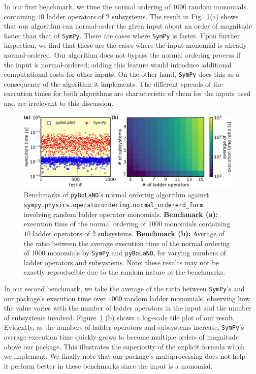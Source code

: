 \documentclass[onecolumn, 12pt, sort&compress]{elsarticle}
\newenvironment{revision}{}{}
\begin{document}
\begin{revision}
In our first benchmark, we time the normal ordering of $1000$ random monomials containing $10$ ladder operators of $2$ subsystems. The result in Fig.~\ref{fig_2}(a) shows that our algorithm can normal-order the given input about an order of magnitude faster than that of \texttt{SymPy}. There are cases where \texttt{SymPy} is faster.  Upon further inspection, we find that these are the cases where the input monomial is already normal-ordered. Our algorithm does not bypass the normal ordering process if the input is normal-ordered; adding this feature would introduce additional computational costs for other inputs. On the other hand, \texttt{SymPy} does this as a consequence of the algorithm it implements. The different spreads of the execution times for both algorithms are characteristic of them for the inputs used and are irrelevant to this discussion. 

\begin{figure}[!t]
    \centering
    \includegraphics[width=\linewidth]{fig_2.png}
    \caption{\begin{revision}Benchmarks of \texttt{pyBoLaNO}'s normal ordering algorithm against \texttt{sympy.physics.operatorordering.normal\_ordererd\_form} involving random ladder operator monomials. \textbf{Benchmark (a):} execution time of the normal ordering of $1000$ monomials containing $10$ ladder operators of $2$ subsystems. \textbf{Benchmark (b):} Average of the ratio between the average execution time of the normal ordering of $1000$ monomials by \texttt{SymPy} and \texttt{pyBoLaNO}, for varying numbers of ladder operators and subsystems. Note: these results may not be exactly reproducible due to the random nature of the benchmarks.\end{revision}}
    \label{fig_2}
\end{figure}

In our second benchmark, we take the average of the ratio between \texttt{SymPy}'s and our package's execution time over $1000$ random ladder monomials, observing how the value varies with the number of ladder operators in the input and the number of subsystems involved. Figure~\ref{fig_2} (b) shows a log-scale tile plot of our result. Evidently, as the numbers of ladder operators and subsystems increase, \texttt{SymPy}'s average execution time quickly grows to become multiple orders of magnitude above our package. This illustrates the superiority of the explicit formula which we implement.  We finally note that our package's multiprocessing does not help it perform better in these benchmarks since the input is a monomial. 

\end{revision}
\end{document}
